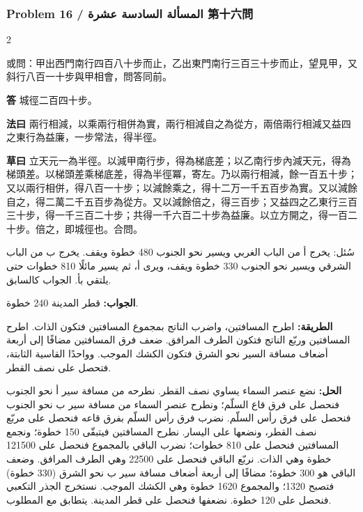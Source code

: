 \documentclass[11pt,a4paper]{article}
\newcommand{\ar}[1]{\arabicfont\beginR #1\endR}
\newcommand{\Answer}[1]{\par\noindent\textbf{\color{problemcolor}答} #1\par}
\newcommand{\Method}[1]{\par\noindent\textbf{\color{problemcolor}法曰} #1\par}
\newcommand{\Workings}[1]{\par\noindent\textbf{\color{problemcolor}草曰} #1\par}
\newcommand{\AnswerAr}{\par\noindent\textbf{\color{problemcolor}\ar{الجواب:}} }
\newcommand{\MethodAr}{\par\noindent\textbf{\color{problemcolor}\ar{الطريقة:}} }
\newcommand{\WorkingsAr}{\par\noindent\textbf{\color{problemcolor}\ar{الحل:}} }
\begin{document}
\vspace{0.5cm}

\subsubsection*{Problem 16 / \ar{المسألة السادسة عشرة} \quad 第十六問}

\begin{paracol}{2}

\noindent 或問：甲出西門南行四百八十步而止，乙出東門南行三百三十步而止，望見甲，又斜行八百一十步與甲相會，問答同前。

\vspace{0.2cm}

\Answer{城徑二百四十步。}

\vspace{0.2cm}

\Method{兩行相減，以乘兩行相併為實，兩行相減自之為從方，兩倍兩行相減又益四之東行為益廉，一步常法，得半徑。}

\vspace{0.2cm}

\Workings{立天元一為半徑。以減甲南行步，得為梯底差；以乙南行步內減天元，得為梯頭差。以梯頭差乘梯底差，得為半徑冪，寄左。乃以兩行相減，餘一百五十步；又以兩行相併，得八百一十步；以減餘乘之，得十二万一千五百步為實。又以減餘自之，得二萬二千五百步為從方。又以減餘倍之，得三百步；又益四之乙東行三百三十步，得一千三百二十步；共得一千六百二十步為益廉。以立方開之，得一百二十步。倍之，即城徑也。合問。}

\switchcolumn

\ar{سُئل: يخرج أ من الباب الغربي ويسير نحو الجنوب 480 خطوة ويقف. يخرج ب من الباب الشرقي ويسير نحو الجنوب 330 خطوة ويقف، ويرى أ، ثم يسير مائلًا 810 خطوات حتى يلتقي بأ. الجواب كالسابق.}

\vspace{0.2cm}

\AnswerAr{قطر المدينة 240 خطوة.}

\vspace{0.2cm}

\MethodAr{اطرح المسافتين، واضرب الناتج بمجموع المسافتين فتكون الذات. اطرح المسافتين وربّع الناتج فتكون الطرف المرافق. ضعف فرق المسافتين مضافًا إلى أربعة أضعاف مسافة السير نحو الشرق فتكون الكشك الموجب. وواحدًا القاسية الثابتة، فتحصل على نصف القطر.}

\vspace{0.2cm}

\WorkingsAr{نضع عنصر السماء يساوي نصف القطر. نطرحه من مسافة سير أ نحو الجنوب فنحصل على فرق قاع السلّم؛ ونطرح عنصر السماء من مسافة سير ب نحو الجنوب فنحصل على فرق رأس السلّم. نضرب فرق رأس السلّم بفرق قاعه فنحصل على مربّع نصف القطر، ونضعها على اليسار. نطرح المسافتين فيتبقّى 150 خطوة؛ ونجمع المسافتين فنحصل على 810 خطوات؛ نضرب الباقي بالمجموع فنحصل على 121500 خطوة وهي الذات. نربّع الباقي فنحصل على 22500 وهي الطرف المرافق. وضعف الباقي هو 300 خطوة؛ مضافًا إلى أربعة أضعاف مسافة سير ب نحو الشرق (330 خطوة) فتصبح 1320؛ والمجموع 1620 خطوة وهي الكشك الموجب. نستخرج الجذر التكعبي فنحصل على 120 خطوة. نضعفها فنحصل على قطر المدينة. يتطابق مع المطلوب.}

\end{paracol}
\end{document}
